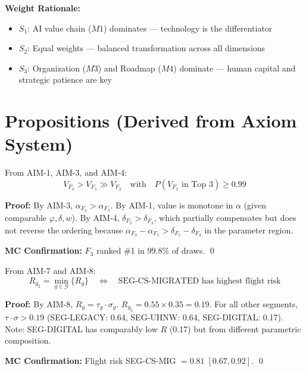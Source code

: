 \textbf{Weight Rationale:}
\begin{itemize}[nosep]
\item $S_1$: AI value chain ($M1$) dominates --- technology is the differentiator
\item $S_2$: Equal weights --- balanced transformation across all dimensions
\item $S_3$: Organization ($M3$) and Roadmap ($M4$) dominate --- human capital and strategic patience are key
\end{itemize}


\section{Propositions (Derived from Axiom System)}
\label{sec:aim-propositions}

\begin{proposition}
\label{prop:aim-must-win}
From AIM-1, AIM-3, and AIM-4:
\begin{equation}
V_{F_3} > V_{F_5} \gg V_{F_2}
\quad \text{with} \quad P(V_{F_3} \text{ in Top 3}) \geq 0.99
\end{equation}

\textbf{Proof:} By AIM-3, $\alpha_{F_3} > \alpha_{F_5}$. By AIM-1, value is
monotone in $\alpha$ (given comparable $\varphi, \delta, w$). By AIM-4,
$\delta_{F_5} > \delta_{F_3}$, which partially compensates but does not
reverse the ordering because $\alpha_{F_3} - \alpha_{F_5} > \delta_{F_5} - \delta_{F_3}$
in the parameter region.

\textbf{MC Confirmation:} $F_3$ ranked \#1 in 99.8\% of draws. \qed
\end{proposition}


\begin{proposition}
\label{prop:aim-cs-risk}
From AIM-7 and AIM-8:
\begin{equation}
R_{g_2} = \min_{g \in \mathcal{G}} \{R_g\}
\quad \Leftrightarrow \quad
\text{SEG-CS-MIGRATED has highest flight risk}
\end{equation}

\textbf{Proof:} By AIM-8, $R_g = \tau_g \cdot \sigma_g$.
$R_{g_2} = 0.55 \times 0.35 = 0.19$. For all other segments,
$\tau \cdot \sigma > 0.19$ (SEG-LEGACY: 0.64, SEG-UHNW: 0.64,
SEG-DIGITAL: 0.17). Note: SEG-DIGITAL has comparably low $R$ (0.17)
but from different parametric composition.

\textbf{MC Confirmation:} Flight risk SEG-CS-MIG $= 0.81 \; [0.67, 0.92]$. \qed
\end{proposition}


